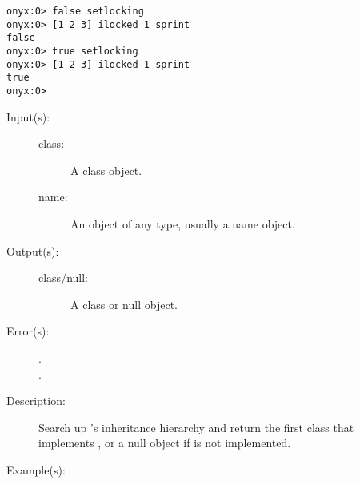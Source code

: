 \begin{description}
\begin{description}
\begin{verbatim}
onyx:0> false setlocking
onyx:0> [1 2 3] ilocked 1 sprint
false
onyx:0> true setlocking
onyx:0> [1 2 3] ilocked 1 sprint
true
onyx:0>
		\end{verbatim}
	\end{description}
\label{systemdict:implementor}
\item[{\onyxop{class name}{implementor}{class/null}}: ]
	\begin{description}\item[]
	\item[Input(s): ]
		\begin{description}\item[]
		\item[class: ]
			A class object.
		\item[name: ]
			An object of any type, usually a name object.
		\end{description}
	\item[Output(s): ]
		\begin{description}\item[]
		\item[class/null: ]
			A class or null object.
		\end{description}
	\item[Error(s): ]
		\begin{description}\item[]
		\item[.]
		\item[.]
		\end{description}
	\item[Description: ]
		Search up 's inheritance hierarchy and return the
		first class that implements , or a null object if
		 is not implemented.
	\item[Example(s): ]\begin{verbatim}


\end{verbatim}
\end{description}
\end{description}
